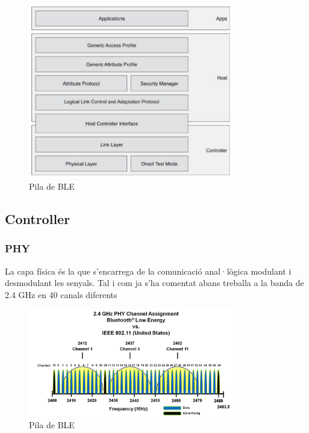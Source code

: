\begin{figure}[h]
	\begin{center}
		\includegraphics[width=0.8\textwidth]{./images/BLE_Stack.png}
		\caption{Pila de BLE \cite{ble_stack}}
		\label{ble_stack}
	\end{center}
\end{figure}


\subsection{Controller}
\subsubsection{PHY}
La capa física és la que s'encarrega de la comunicació anal·lògica modulant i desmodulant les senyals.
Tal i com ja s'ha comentat abans treballa a la banda de 2.4 GHz en 40 canals diferents

\begin{figure}[h]
	\begin{center}
		\includegraphics[width=0.8\textwidth]{./images/ble_channel_assignment.png}
		\caption{Pila de BLE \cite{ble_stack}}
		\label{ble_stack}
	\end{center}
\end{figure}

